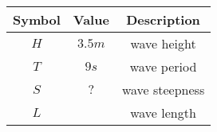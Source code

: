 \begin{tabular}{|c|c|c|}
	\hline
	\textbf{Symbol} & \textbf{Value} &
	\textbf{Description}\\[6pt]
	\hline
	$H$ &  $3.5m$ & wave height\\[6pt]
	\hline 
	$T$ & $9s$ & wave period\\[6pt]
	\hline
	$S$ & $ ? $ & wave steepness\\[6pt]
	\hline
	$L$ & $  $ & wave length\\[6pt]
	\hline
\end{tabular}
